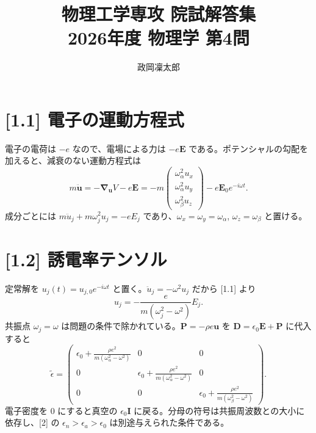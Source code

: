 \documentclass[11pt,a4paper]{article}
\title{物理工学専攻 院試解答集\\2026年度 物理学 第4問}
\author{政岡凜太郎}
\date{}
\begin{document}
\maketitle

\section*{[1.1] 電子の運動方程式}
電子の電荷は $-e$ なので、電場による力は $-e\boldsymbol E$ である。ポテンシャルの勾配を加えると、減衰のない運動方程式は
\[
\boxed{m\ddot{\boldsymbol u}=-\boldsymbol\nabla_{\boldsymbol u}V-e\boldsymbol E
=-m\begin{pmatrix}\omega_\alpha^2u_x\\\omega_\alpha^2u_y\\\omega_\beta^2u_z\end{pmatrix}
-e\boldsymbol E_0e^{-i\omega t}.}
\]
成分ごとには $m\ddot u_j+m\omega_j^2u_j=-eE_j$ であり、$\omega_x=\omega_y=\omega_\alpha$, $\omega_z=\omega_\beta$ と置ける。

\section*{[1.2] 誘電率テンソル}
定常解を $u_j(t)=u_{j,0}e^{-i\omega t}$ と置く。$\ddot u_j=-\omega^2u_j$ だから [1.1] より
\[
u_j=-\frac{e}{m(\omega_j^2-\omega^2)}E_j.
\]
共振点 $\omega_j=\omega$ は問題の条件で除かれている。$\boldsymbol P=-\rho e\boldsymbol u$ を $\boldsymbol D=\epsilon_0\boldsymbol E+\boldsymbol P$ に代入すると
\[
\boxed{\tilde\epsilon=
\begin{pmatrix}
\displaystyle\epsilon_0+\frac{\rho e^2}{m(\omega_\alpha^2-\omega^2)}&0&0\\
0&\displaystyle\epsilon_0+\frac{\rho e^2}{m(\omega_\alpha^2-\omega^2)}&0\\
0&0&\displaystyle\epsilon_0+\frac{\rho e^2}{m(\omega_\beta^2-\omega^2)}
\end{pmatrix}.}
\]
電子密度を $0$ にすると真空の $\epsilon_0\mathbf I$ に戻る。分母の符号は共振周波数との大小に依存し、[2] の $\epsilon_n>\epsilon_a>\epsilon_0$ は別途与えられた条件である。
\end{document}
